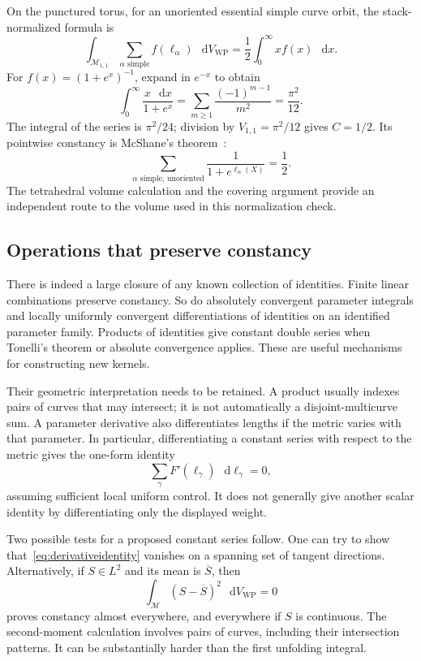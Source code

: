 \documentclass[11pt,a4paper]{article}
\numberwithin{equation}{section}
\theoremstyle{definition}
\theoremstyle{remark}
\newcommand{\dd}{\mathop{}\!\mathrm d}
\newcommand{\WP}{\mathrm{WP}}
\newcommand{\M}{\mathcal M}
\newcommand{\dV}{\dd V_{\WP}}
\begin{document}
On the punctured torus, for an unoriented essential simple curve orbit,
the stack-normalized formula is
\begin{equation}
 \int_{\M_{1,1}}\sum_{\alpha\text{ simple}}f(\ell_\alpha)\,\dV
       =\frac12\int_0^\infty x f(x)\,\dd x.
 \label{eq:torusunfold}
\end{equation}
For $f(x)=(1+e^x)^{-1}$, expand in $e^{-x}$ to obtain
\[
 \int_0^\infty\frac{x\,\dd x}{1+e^x}
   =\sum_{m\ge1}\frac{(-1)^{m-1}}{m^2}=\frac{\pi^2}{12}.
\]
The integral of the series is $\pi^2/24$; division by
$V_{1,1}=\pi^2/12$ gives $C=1/2$. Its pointwise constancy is McShane's
theorem~\cite{McShane}:
\begin{equation}
 \sum_{\alpha\text{ simple, unoriented}}
                 \frac{1}{1+e^{\ell_\alpha(X)}}=\frac12.
 \label{eq:mcshane}
\end{equation}
The tetrahedral volume calculation and the covering argument provide an
independent route to the volume used in this normalization check.

\subsection{Operations that preserve constancy}

There is indeed a large closure of any known collection of identities.
Finite linear combinations preserve constancy. So do absolutely convergent
parameter integrals and locally uniformly convergent differentiations of
identities on an identified parameter family. Products of identities give
constant double series when Tonelli's theorem or absolute convergence
applies. These are useful mechanisms for constructing new kernels.

Their geometric interpretation needs to be retained. A product usually
indexes pairs of curves that may intersect; it is not automatically a
disjoint-multicurve sum. A parameter derivative also differentiates lengths
if the metric varies with that parameter. In particular, differentiating
a constant series with respect to the metric gives the one-form identity
\begin{equation}
 \sum_\gamma F'(\ell_\gamma)\,\dd\ell_\gamma=0,
 \label{eq:derivativeidentity}
\end{equation}
assuming sufficient local uniform control. It does not generally give
another scalar identity by differentiating only the displayed weight.

Two possible tests for a proposed constant series follow. One can try to
show that~\eqref{eq:derivativeidentity} vanishes on a spanning set of tangent
directions. Alternatively, if $S\in L^2$ and its mean is $\overline S$, then
\begin{equation}
 \int_{\M}(S-\overline S)^2\,\dV=0
 \label{eq:variance}
\end{equation}
proves constancy almost everywhere, and everywhere if $S$ is continuous.
The second-moment calculation involves pairs of curves, including their
intersection patterns. It can be substantially harder than the first
unfolding integral.
\end{document}
